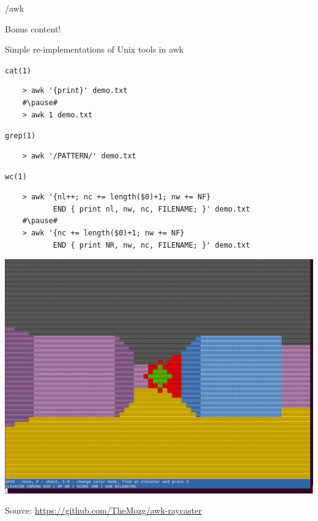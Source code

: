 \documentclass{beamer}
\renewcommand\big[1]{
  \begin{center}
    \Large{#1}
  \end{center}
}
\begin{document}
\begin{frame}
  \centering\Huge{/awk}
\end{frame}

\begin{frame}
  \centering\Huge{Bonus content!}
  \big{Simple re-implementations of Unix tools in awk}
\end{frame}

\begin{frame}[fragile]
  \big{\texttt{cat(1)}}
  \pause
  \begin{lstlisting}
    > awk '{print}' demo.txt
    #\pause#
    > awk 1 demo.txt
  \end{lstlisting}
\end{frame}

\begin{frame}[fragile]
  \big{\texttt{grep(1)}}
  \pause
  \begin{lstlisting}
    > awk '/PATTERN/' demo.txt
  \end{lstlisting}
\end{frame}

\begin{frame}[fragile]
  \big{\texttt{wc(1)}}
  \pause
  \begin{lstlisting}
    > awk '{nl++; nc += length($0)+1; nw += NF}
           END { print nl, nw, nc, FILENAME; }' demo.txt
    #\pause#
    > awk '{nc += length($0)+1; nw += NF}
           END { print NR, nw, nc, FILENAME; }' demo.txt
  \end{lstlisting}
\end{frame}

\begin{frame}[fragile]
  \begin{center}\includegraphics[scale=.22]{awkaster.png}\end{center}
  \scriptsize{Source: \url{https://github.com/TheMozg/awk-raycaster}}
\end{frame}
\end{document}
